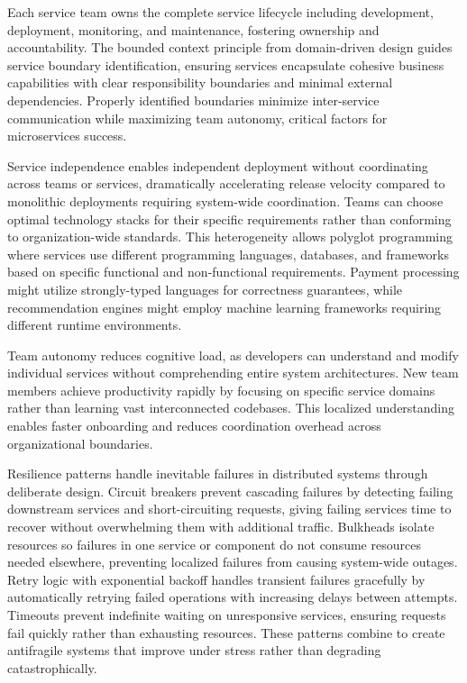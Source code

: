 \documentclass[a4paper, 12pt]{report}
\begin{document}
Each service team owns the complete service lifecycle including development, deployment, monitoring, and maintenance, fostering ownership and accountability. The bounded context principle from domain-driven design guides service boundary identification, ensuring services encapsulate cohesive business capabilities with clear responsibility boundaries and minimal external dependencies. Properly identified boundaries minimize inter-service communication while maximizing team autonomy, critical factors for microservices success.

Service independence enables independent deployment without coordinating across teams or services, dramatically accelerating release velocity compared to monolithic deployments requiring system-wide coordination. Teams can choose optimal technology stacks for their specific requirements rather than conforming to organization-wide standards. This heterogeneity allows polyglot programming where services use different programming languages, databases, and frameworks based on specific functional and non-functional requirements. Payment processing might utilize strongly-typed languages for correctness guarantees, while recommendation engines might employ machine learning frameworks requiring different runtime environments.

Team autonomy reduces cognitive load, as developers can understand and modify individual services without comprehending entire system architectures. New team members achieve productivity rapidly by focusing on specific service domains rather than learning vast interconnected codebases. This localized understanding enables faster onboarding and reduces coordination overhead across organizational boundaries.

Resilience patterns handle inevitable failures in distributed systems through deliberate design. Circuit breakers prevent cascading failures by detecting failing downstream services and short-circuiting requests, giving failing services time to recover without overwhelming them with additional traffic. Bulkheads isolate resources so failures in one service or component do not consume resources needed elsewhere, preventing localized failures from causing system-wide outages. Retry logic with exponential backoff handles transient failures gracefully by automatically retrying failed operations with increasing delays between attempts. Timeouts prevent indefinite waiting on unresponsive services, ensuring requests fail quickly rather than exhausting resources. These patterns combine to create antifragile systems that improve under stress rather than degrading catastrophically.
\end{document}
